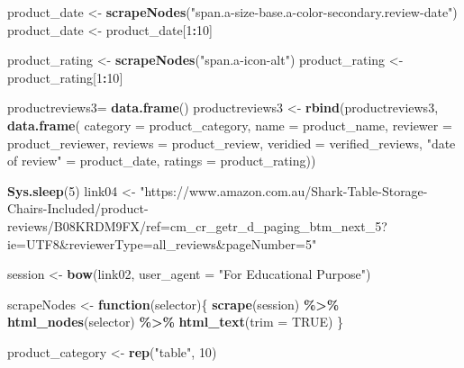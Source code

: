 \documentclass[
]{article}
\newenvironment{Shaded}{\begin{snugshade}}{\end{snugshade}}
\newcommand{\AttributeTok}[1]{\textcolor[rgb]{0.13,0.29,0.53}{#1}}
\newcommand{\ConstantTok}[1]{\textcolor[rgb]{0.56,0.35,0.01}{#1}}
\newcommand{\ControlFlowTok}[1]{\textcolor[rgb]{0.13,0.29,0.53}{\textbf{#1}}}
\newcommand{\DecValTok}[1]{\textcolor[rgb]{0.00,0.00,0.81}{#1}}
\newcommand{\FunctionTok}[1]{\textcolor[rgb]{0.13,0.29,0.53}{\textbf{#1}}}
\newcommand{\NormalTok}[1]{#1}
\newcommand{\OtherTok}[1]{\textcolor[rgb]{0.56,0.35,0.01}{#1}}
\newcommand{\SpecialCharTok}[1]{\textcolor[rgb]{0.81,0.36,0.00}{\textbf{#1}}}
\newcommand{\StringTok}[1]{\textcolor[rgb]{0.31,0.60,0.02}{#1}}
\begin{document}
\begin{Shaded}
\begin{Highlighting}[]
\NormalTok{  product\_date }\OtherTok{\textless{}{-}} \FunctionTok{scrapeNodes}\NormalTok{(}\StringTok{"span.a{-}size{-}base.a{-}color{-}secondary.review{-}date"}\NormalTok{)}
\NormalTok{  product\_date }\OtherTok{\textless{}{-}}\NormalTok{ product\_date[}\DecValTok{1}\SpecialCharTok{:}\DecValTok{10}\NormalTok{]}
  
\NormalTok{  product\_rating }\OtherTok{\textless{}{-}} \FunctionTok{scrapeNodes}\NormalTok{(}\StringTok{"span.a{-}icon{-}alt"}\NormalTok{)}
\NormalTok{  product\_rating }\OtherTok{\textless{}{-}}\NormalTok{ product\_rating[}\DecValTok{1}\SpecialCharTok{:}\DecValTok{10}\NormalTok{]}
  
\NormalTok{  productreviews3}\OtherTok{=} \FunctionTok{data.frame}\NormalTok{()}
\NormalTok{  productreviews3 }\OtherTok{\textless{}{-}} \FunctionTok{rbind}\NormalTok{(productreviews3, }\FunctionTok{data.frame}\NormalTok{(}
                      \AttributeTok{category =}\NormalTok{ product\_category,}
                      \AttributeTok{name =}\NormalTok{ product\_name,}
                      \AttributeTok{reviewer =}\NormalTok{ product\_reviewer,}
                      \AttributeTok{reviews =}\NormalTok{ product\_review,}
                      \AttributeTok{veridied =}\NormalTok{ verified\_reviews,}
                      \StringTok{"date of review"} \OtherTok{=}\NormalTok{ product\_date,}
                      \AttributeTok{ratings =}\NormalTok{ product\_rating))}
  
   \FunctionTok{Sys.sleep}\NormalTok{(}\DecValTok{5}\NormalTok{)}
\NormalTok{link04 }\OtherTok{\textless{}{-}} \StringTok{"https://www.amazon.com.au/Shark{-}Table{-}Storage{-}Chairs{-}Included/product{-}reviews/B08KRDM9FX/ref=cm\_cr\_getr\_d\_paging\_btm\_next\_5?ie=UTF8\&reviewerType=all\_reviews\&pageNumber=5"}


\NormalTok{  session }\OtherTok{\textless{}{-}} \FunctionTok{bow}\NormalTok{(link02,}
               \AttributeTok{user\_agent =} \StringTok{"For Educational Purpose"}\NormalTok{)}

\NormalTok{  scrapeNodes }\OtherTok{\textless{}{-}} \ControlFlowTok{function}\NormalTok{(selector)\{}
    \FunctionTok{scrape}\NormalTok{(session) }\SpecialCharTok{\%\textgreater{}\%}
      \FunctionTok{html\_nodes}\NormalTok{(selector) }\SpecialCharTok{\%\textgreater{}\%}
      \FunctionTok{html\_text}\NormalTok{(}\AttributeTok{trim =} \ConstantTok{TRUE}\NormalTok{)}
\NormalTok{  \}}

\NormalTok{  product\_category }\OtherTok{\textless{}{-}} \FunctionTok{rep}\NormalTok{(}\StringTok{"table"}\NormalTok{, }\DecValTok{10}\NormalTok{)}


\end{Highlighting}
\end{Shaded}
\end{document}
